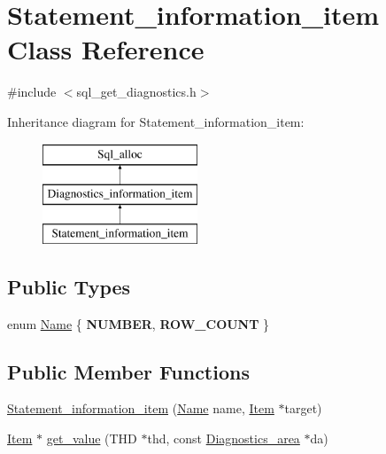 \hypertarget{classStatement__information__item}{}\section{Statement\+\_\+information\+\_\+item Class Reference}
\label{classStatement__information__item}


{\ttfamily \#include $<$sql\+\_\+get\+\_\+diagnostics.\+h$>$}

Inheritance diagram for Statement\+\_\+information\+\_\+item\+:\begin{figure}[H]
\begin{center}
\leavevmode
\includegraphics[height=3.000000cm]{classStatement__information__item}
\end{center}
\end{figure}
\subsection*{Public Types}
\begin{DoxyCompactItemize}
\item 
enum \mbox{\hyperlink{classStatement__information__item_ae867c415a95de0d9e6ce1e87a0227031}{Name}} \{ {\bfseries N\+U\+M\+B\+ER}, 
{\bfseries R\+O\+W\+\_\+\+C\+O\+U\+NT}
 \}
\end{DoxyCompactItemize}
\subsection*{Public Member Functions}
\begin{DoxyCompactItemize}
\item 
\mbox{\hyperlink{classStatement__information__item_a23c389e0893d1f0e26552b1f6cc45c69}{Statement\+\_\+information\+\_\+item}} (\mbox{\hyperlink{classStatement__information__item_ae867c415a95de0d9e6ce1e87a0227031}{Name}} name, \mbox{\hyperlink{classItem}{Item}} $\ast$target)
\item 
\mbox{\hyperlink{classItem}{Item}} $\ast$ \mbox{\hyperlink{classStatement__information__item_addf142e0f87ba39018e964286a89367c}{get\+\_\+value}} (T\+HD $\ast$thd, const \mbox{\hyperlink{classDiagnostics__area}{Diagnostics\+\_\+area}} $\ast$da)
\end{DoxyCompactItemize}
